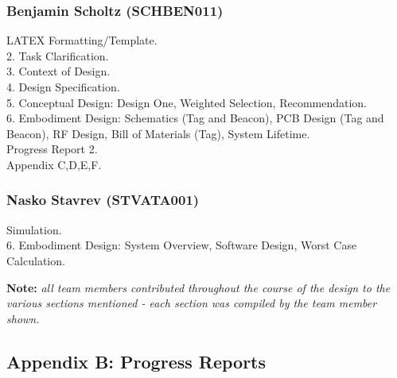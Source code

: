 \subsubsection*{Benjamin Scholtz (SCHBEN011)}
LATEX Formatting/Template. \\
2. Task Clarification. \\
3. Context of Design. \\
4. Design Specification. \\
5. Conceptual Design: Design One, Weighted Selection, Recommendation. \\
6. Embodiment Design: Schematics (Tag and Beacon), PCB Design (Tag and Beacon), RF Design, Bill of Materials (Tag), System Lifetime. \\
Progress Report 2. \\
Appendix C,D,E,F.
\subsubsection*{Nasko Stavrev (STVATA001)}
Simulation.\\
6. Embodiment Design: System Overview, Software Design, Worst Case Calculation.

\vfill
\textbf{Note: }\textit{all team members contributed throughout the course of the design to the various sections mentioned - each section was compiled by the team member shown.}

\newpage
\vspace*{\fill}
\begin{center}
\subsection*{Appendix B: Progress Reports}
\end{center}
\vspace*{\fill}

\newpage
